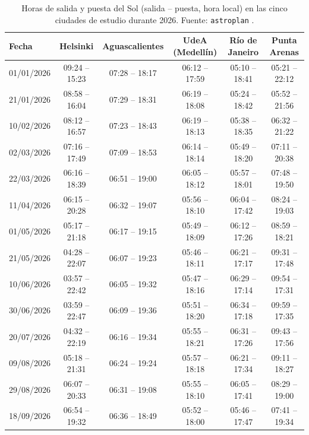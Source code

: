 \begin{table}[H]
  \centering
  \caption{Horas de salida y puesta del Sol (salida -- puesta, hora local) en las cinco
           ciudades de estudio durante 2026.
           Fuente: \texttt{astroplan} \citep{Morris2018}.}
  \label{tab:salida_puesta}
  {\scriptsize
  \begin{tabular}{lccccc}
    \toprule
    \textbf{Fecha} &
    \textbf{Helsinki} &
    \textbf{Aguascalientes} &
    \textbf{UdeA (Medellín)} &
    \textbf{Río de Janeiro} &
    \textbf{Punta Arenas} \\
    \midrule
    01/01/2026 & 09:24 -- 15:23 & 07:28 -- 18:17 & 06:12 -- 17:59 & 05:10 -- 18:41 & 05:21 -- 22:12 \\
    21/01/2026 & 08:58 -- 16:04 & 07:29 -- 18:31 & 06:19 -- 18:08 & 05:24 -- 18:42 & 05:52 -- 21:56 \\
    10/02/2026 & 08:12 -- 16:57 & 07:23 -- 18:43 & 06:19 -- 18:13 & 05:38 -- 18:35 & 06:32 -- 21:22 \\
    02/03/2026 & 07:16 -- 17:49 & 07:09 -- 18:53 & 06:14 -- 18:14 & 05:49 -- 18:20 & 07:11 -- 20:38 \\
    22/03/2026 & 06:16 -- 18:39 & 06:51 -- 19:00 & 06:05 -- 18:12 & 05:57 -- 18:01 & 07:48 -- 19:50 \\
    11/04/2026 & 06:15 -- 20:28 & 06:32 -- 19:07 & 05:56 -- 18:10 & 06:04 -- 17:42 & 08:24 -- 19:03 \\
    01/05/2026 & 05:17 -- 21:18 & 06:17 -- 19:15 & 05:49 -- 18:09 & 06:12 -- 17:26 & 08:59 -- 18:21 \\
    21/05/2026 & 04:28 -- 22:07 & 06:07 -- 19:23 & 05:46 -- 18:11 & 06:21 -- 17:17 & 09:31 -- 17:48 \\
    10/06/2026 & 03:57 -- 22:42 & 06:05 -- 19:32 & 05:47 -- 18:16 & 06:29 -- 17:14 & 09:54 -- 17:31 \\
    30/06/2026 & 03:59 -- 22:47 & 06:09 -- 19:36 & 05:51 -- 18:20 & 06:34 -- 17:18 & 09:59 -- 17:35 \\
    20/07/2026 & 04:32 -- 22:19 & 06:16 -- 19:34 & 05:55 -- 18:21 & 06:31 -- 17:26 & 09:43 -- 17:56 \\
    09/08/2026 & 05:18 -- 21:31 & 06:24 -- 19:24 & 05:57 -- 18:18 & 06:21 -- 17:34 & 09:11 -- 18:27 \\
    29/08/2026 & 06:07 -- 20:33 & 06:31 -- 19:08 & 05:55 -- 18:10 & 06:05 -- 17:41 & 08:29 -- 19:00 \\
    18/09/2026 & 06:54 -- 19:32 & 06:36 -- 18:49 & 05:52 -- 18:00 & 05:46 -- 17:47 & 07:41 -- 19:34 \\

\end{tabular}}
\end{table}
